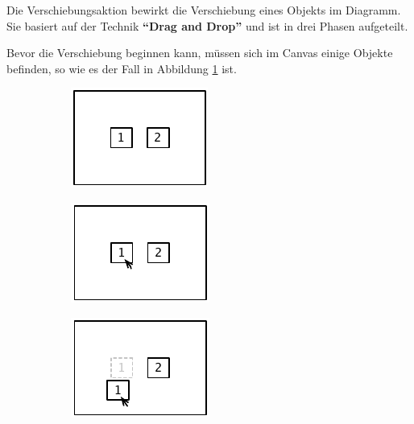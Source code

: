 Die Verschiebungsaktion bewirkt die Verschiebung eines Objekts im Diagramm. Sie basiert auf der Technik \textbf{\enquote{Drag and Drop}} und ist in drei Phasen aufgeteilt.

Bevor die Verschiebung beginnen kann, müssen sich im Canvas einige Objekte befinden, so wie es der Fall in Abbildung \ref{fig:movement-action-example-a} ist.

\begin{figure}[hbt]
    \newcommand{\subfigurewidth}{0.28\textwidth}
    \newcommand{\graphicsscale}{1.2}
    \centering
    \begin{subfigure}{\subfigurewidth}
        \centering
        \includegraphics[scale=\graphicsscale]{resources/movement-action-example-a}
        \caption{}
        \label{fig:movement-action-example-a}
    \end{subfigure}
    \begin{subfigure}{\subfigurewidth}
        \centering
        \includegraphics[scale=\graphicsscale]{resources/movement-action-example-b}
        \caption{}
        \label{fig:movement-action-example-b}
    \end{subfigure}
    \begin{subfigure}{\subfigurewidth}
        \centering
        \includegraphics[scale=\graphicsscale]{resources/movement-action-example-c}
        \caption{}
        \label{fig:movement-action-example-c}
    \end{subfigure}
    \begin{subfigure}{\subfigurewidth}

\end{subfigure}
\end{figure}
